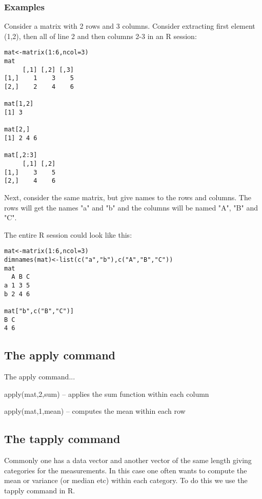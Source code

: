 \documentclass[12pt,a4paper]{article}
\theoremstyle{regla}
\theoremstyle{remark}
\theoremstyle{definition}
\theoremstyle{nonumberbreak}
\begin{document}
\subsubsection{Examples}
\begin{xmpl}
 Consider a matrix with 2 rows and 3 columns.  Consider extracting first element (1,2), then all of line 2 and then columns 2-3 in an R session:

\begin{lstlisting}
mat<-matrix(1:6,ncol=3)
mat
     [,1] [,2] [,3]
[1,]    1    3    5
[2,]    2    4    6

mat[1,2]
[1] 3

mat[2,]
[1] 2 4 6

mat[,2:3]
     [,1] [,2]
[1,]    3    5
[2,]    4    6
\end{lstlisting}

Next, consider the same matrix, but give names to the rows and columns.
The rows will get the names "a" and "b"
and the columns will be named "A", "B" and "C".

The entire R session could look like this: 
\begin{lstlisting}
mat<-matrix(1:6,ncol=3)
dimnames(mat)<-list(c("a","b"),c("A","B","C"))
mat
  A B C
a 1 3 5
b 2 4 6

mat["b",c("B","C")]
B C 
4 6 

\end{lstlisting}
\end{xmpl}

\subsection{The apply command}
\begin{fbox}
\begin{minipage}{0.97\textwidth}
The apply command...

apply(mat,2,sum) -- applies the sum function within each column

apply(mat,1,mean) -- computes the mean within each row

\end{minipage}
\end{fbox}

\subsection{The tapply command}
\begin{fbox}
\begin{minipage}{0.97\textwidth}
Commonly one has a data vector and another vector of the same length giving categories for the measurements.
In this case one often wants to compute the mean or variance (or median etc) within each category. To do this we use the tapply command in R.

\end{minipage}
\end{fbox}
\end{document}
